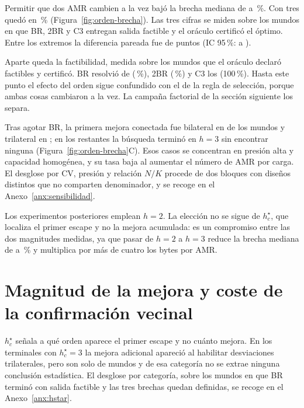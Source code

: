 \documentclass[12pt,a4paper]{article}
\theoremstyle{remark}
\theoremstyle{plain}
\begin{document}
Permitir que dos AMR cambien a la vez bajó la brecha mediana de
\SPoneBRGapCommon{} a \SPoneTwoBRGapCommon\,\%. Con tres quedó en
\SPoneCThreeGapCommon\,\% (Figura~\ref{fig:orden-brecha}). Las tres cifras se miden
sobre los \SPoneCommonWorlds{} mundos en que BR, 2BR y C3 entregan salida factible
y el oráculo certificó el óptimo. Entre los extremos la diferencia pareada fue de
\SPoneCThreeMinusBRCommon{} puntos (IC 95\,\%:
\SPoneCThreeMinusBRCommonLo{} a \SPoneCThreeMinusBRCommonHi).

Aparte queda la factibilidad, medida sobre los \SPoneCertWorlds{} mundos que el
oráculo declaró factibles y certificó. BR resolvió \SPoneBRFeasN{} de
\SPoneCertWorlds{} (\SPoneBRFeasRound\,\%), 2BR \SPoneTwoBRFeasN{}
(\SPoneTwoBRFeasRound\,\%) y C3 los \SPoneCertWorlds{} (100\,\%). Hasta este punto el efecto
del orden sigue confundido con el de la regla de selección, porque ambas cosas
cambiaron a la vez. La campaña factorial de la sección siguiente los separa.

Tras agotar BR, la primera mejora conectada fue bilateral en \NFourHStarTwoN{} de
los \NFourHStarWorldsN{} mundos y trilateral en \NFourHStarThreeN; en los
\NFourHStarGtThreeN{} restantes la búsqueda terminó en $h=3$ sin encontrar ninguna
(Figura~\ref{fig:orden-brecha}C). Esos \NFourHStarGtThreeN{} casos se concentran
en presión alta y capacidad homogénea, y su tasa baja al aumentar el número de AMR
por carga. El desglose por CV, presión y relación $N/K$ procede de dos bloques con
diseños distintos que no comparten denominador, y se recoge en el
Anexo~\ref{anx:sensibilidad}.

Los experimentos posteriores emplean $h=2$. La elección no se sigue de
$h_c^\star$, que localiza el primer escape y no la mejora acumulada: es un
compromiso entre las dos magnitudes medidas, ya que pasar de $h=2$ a $h=3$ reduce
la brecha mediana de \SPoneTwoBRGapCommon{} a \SPoneCThreeGapCommon\,\% y
multiplica por más de cuatro los bytes por AMR.


\section{Magnitud de la mejora y coste de la confirmación vecinal}

$h_c^\star$ señala a qué orden aparece el primer escape y no cuánto mejora. En los
\NFourHStarLinkThreeN{} terminales con $h_c^\star=3$ la mejora adicional apareció
al habilitar desviaciones trilaterales, pero son solo \NFourHStarLinkThreeN{} de
\NFourHStarWorldsN{} mundos y de esa categoría no se extrae ninguna conclusión
estadística. El desglose por categoría, sobre los \NFourHStarLinkN{} mundos en que
BR terminó con salida factible y las tres brechas quedan definidas, se recoge en
el Anexo~\ref{anx:hstar}.
\end{document}
